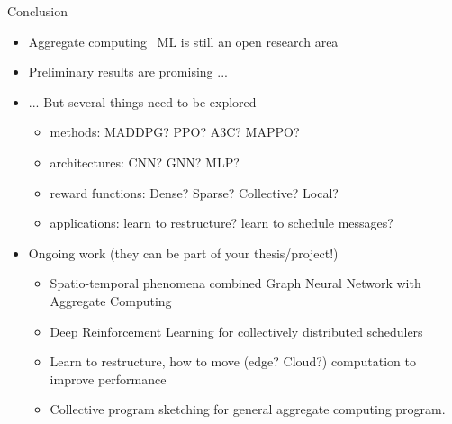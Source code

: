 \documentclass[presentation, 8pt]{beamer}\mode<presentation>{\usetheme{AMSBolognaFC}}
\begin{document}
\begin{frame}{Conclusion}
\begin{itemize}
	\item Aggregate computing \faPlus \, ML is still an open research area
	\item Preliminary results are promising ...
	\item ... But several things need to be explored
	\begin{itemize}
		\item methods: MADDPG? PPO? A3C? MAPPO?
		\item architectures: CNN? GNN? MLP?
		\item reward functions: Dense? Sparse? Collective? Local?
		\item applications: learn to restructure? learn to schedule messages?
	\end{itemize}
	\item Ongoing work (they can be part of your thesis/project!)
	\begin{itemize}
		\item Spatio-temporal phenomena combined Graph Neural Network with Aggregate Computing
		\item Deep Reinforcement Learning for collectively distributed schedulers
		\item Learn to restructure, how to move (edge? Cloud?) computation to improve performance
		\item Collective program sketching for general aggregate computing program.
	\end{itemize}
\end{itemize}
\end{frame}
\section*{}

\frame{\titlepage}

\section*{\refname}

\end{document}
